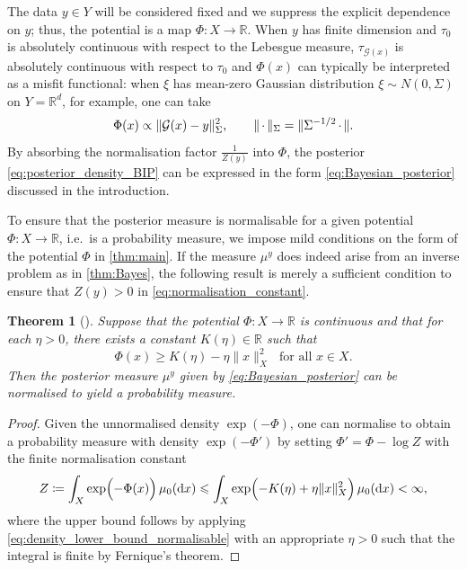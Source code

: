 \documentclass[11pt]{article}
\newcommand*{\defeq}{\coloneqq}
\newcommand*{\quark}{\setbox0\hbox{$x$}\hbox to\wd0{\hss$\cdot$\hss}}
\newcommand*{\rd}{\mathrm{d}}
\newcommand*{\Reals}{\mathbb{R}}
\renewcommand*{\geq}{\geqslant}
\renewcommand*{\leq}{\leqslant}
\theoremstyle{plain}
\newtheorem{theorem}{Theorem}[section]
\theoremstyle{definition}
\newcommand{\norm}[1]{\lVert #1 \rVert}
\numberwithin{equation}{section}
\numberwithin{figure}{section}
\numberwithin{table}{section}
\begin{document}
The data $y \in Y$ will be considered fixed and we suppress the explicit dependence on $y$; thus, the potential is a map $\Phi \colon X \to \Reals$.
When $y$ has finite dimension and $\tau_{0}$ is absolutely continuous with respect to the Lebesgue measure, $\tau_{\mathcal{G}(x)}$ is absolutely continuous with respect to $\tau_{0}$ and $\Phi(x)$ can typically be interpreted as a misfit functional: 
when $\xi$ has mean-zero Gaussian distribution $\xi \sim N(0, \Sigma)$ on $Y = \Reals^{d}$, for example, one can take
\begin{equation}
	\label{eq:Gaussian-noise_BIP_potential}
	\Phi(x) \propto \norm{\mathcal{G}(x) - y}_{\Sigma}^{2},~~~~~~\norm{\quark}_{\Sigma} = \norm{\Sigma^{-1/2} \quark}.
\end{equation}
By absorbing the normalisation factor $\tfrac{1}{Z(y)}$ into $\Phi$, the posterior \eqref{eq:posterior_density_BIP} can be expressed in the form \eqref{eq:Bayesian_posterior} discussed in the introduction.

To ensure that the posterior measure is normalisable for a given potential $\Phi \colon X \to \Reals$, i.e.\ is a probability measure, we impose mild conditions on the form of the potential $\Phi$ in \cref{thm:main}.
If the measure $\mu^{y}$ does indeed arise from an inverse problem as in \cref{thm:Bayes}, the following result is merely a sufficient condition to ensure that $Z(y) > 0$ in \eqref{eq:normalisation_constant}.

\begin{theorem}[{\citealp[Theorem~4.1]{Stuart2010}}]
	\label{thm:Phi_normalisable}
	Suppose that the potential $\Phi \colon X \to \Reals$ is continuous and that for each $\eta > 0$, there exists a constant $K(\eta) \in \Reals$ such that
	\begin{equation} \label{eq:density_lower_bound_normalisable}
		\Phi(x) \geq K(\eta) - \eta\norm{x}_X^2 \text{~~for all $x \in X$.}
	\end{equation}
	Then the posterior measure $\mu^{y}$ given by \eqref{eq:Bayesian_posterior} can be normalised to yield a probability measure.
\end{theorem}

\begin{proof}
	Given the unnormalised density $\exp(-\Phi)$, one can normalise to obtain a probability measure with density $\exp(-\Phi')$ by setting $\Phi' = \Phi - \log Z$ with the finite normalisation constant
	\begin{equation*}
		Z \defeq \int_X \exp\Bigl(-\Phi(x)\Bigr)\,\mu_0(\rd x) \leq \int_X \exp\Bigl(-K(\eta) + \eta \norm{x}_X^2\Bigr) \,\mu_{0}(\rd x) < \infty,
	\end{equation*}
	where the upper bound follows by applying \eqref{eq:density_lower_bound_normalisable} with an appropriate $\eta > 0$ such that the integral is finite by Fernique's theorem.
\end{proof}
\end{document}
